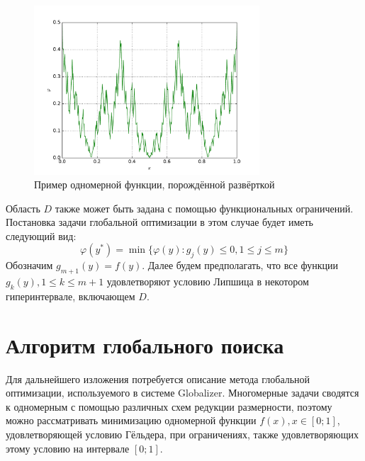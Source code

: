 \begin{figure}[ht]
    \center
    \includegraphics[width=0.75\textwidth]{images/map_paraboloid.pdf}
    \caption{Пример одномерной функции, порождённой развёрткой}
    \label{fig:evolvent_example}
\end{figure}

Область \(D\) также может быть задана с помощью функциональных ограничений.
Постановка задачи глобальной оптимизации в этом случае будет иметь следующий вид:
\begin{equation}
  \label{eq:constrained_problem}
  \varphi(y^*)=\min\{\varphi(y):g_j(y)\leqslant 0, 1\leqslant j\leqslant m\}
\end{equation}
Обозначим \(g_{m+1}(y)=f(y)\). Далее будем предполагать, что все функции \(g_k(y),1\leqslant k \leqslant m+1\)
удовлетворяют условию Липшица в некотором гиперинтервале, включающем \(D\).

\section{Алгоритм глобального поиска} \label{sec:method}
Для дальнейшего изложения потребуется описание метода глобальной оптимизации,
используемого в системе Globalizer. Многомерные задачи сводятся к одномерным с помощью
различных схем редукции размерности, поэтому можно рассматривать минимизацию одномерной
функции \(f(x), x\in[0;1]\), удовлетворяющей условию Гёльдера, при ограничениях, также
удовлетворяющих этому условию на интервале \([0;1]\).

